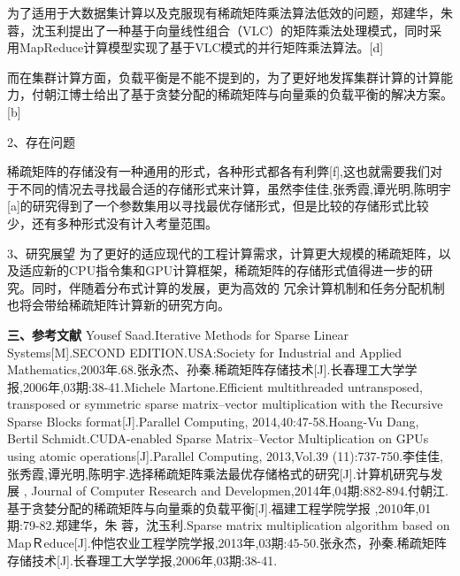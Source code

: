 \documentclass{article}
\begin{document}
为了适用于大数据集计算以及克服现有稀疏矩阵乘法算法低效的问题，郑建华，朱 蓉，沈玉利提出了一种基于向量线性组合（VLC）的矩阵乘法处理模式，同时采用MapReduce计算模型实现了基于VLC模式的并行矩阵乘法算法。[d]

而在集群计算方面，负载平衡是不能不提到的，为了更好地发挥集群计算的计算能力，付朝江博士给出了基于贪婪分配的稀疏矩阵与向量乘的负载平衡的解决方案。[b]


2、存在问题\newline

稀疏矩阵的存储没有一种通用的形式，各种形式都各有利弊[f],这也就需要我们对于不同的情况去寻找最合适的存储形式来计算，虽然李佳佳,张秀霞,谭光明,陈明宇[a]的研究得到了一个参数集用以寻找最优存储形式，但是比较的存储形式比较少，还有多种形式没有计入考量范围。
\newline

3、研究展望\newline
为了更好的适应现代的工程计算需求，计算更大规模的稀疏矩阵，以及适应新的CPU指令集和GPU计算框架，稀疏矩阵的存储形式值得进一步的研究。同时，伴随着分布式计算的发展，更为高效的
冗余计算机制和任务分配机制也将会带给稀疏矩阵计算新的研究方向。

\textbf{三、参考文献}
      \qquad
\newline
 [1]Yousef Saad.Iterative Methods for Sparse Linear Systems[M].SECOND EDITION.USA:Society for Industrial and Applied Mathematics,2003年.68.\newline
 [2]张永杰、孙秦.稀疏矩阵存储技术[J].长春理工大学学报,2006年,03期:38-41.\newline
  [x]Michele Martone.Efficient multithreaded untransposed, transposed or symmetric sparse matrix–vector multiplication with the Recursive Sparse Blocks format[J].Parallel Computing, 2014,40:47-58.\newline
   [y]Hoang-Vu Dang,  Bertil Schmidt.CUDA-enabled Sparse Matrix–Vector Multiplication on GPUs
using atomic operations[J].Parallel Computing, 2013,Vol.39 (11):737-750.\newline
  [a]李佳佳,张秀霞,谭光明,陈明宇.选择稀疏矩阵乘法最优存储格式的研究[J].计算机研究与发展 , Journal of Computer Research and Developmen,2014年,04期:882-894.\newline
[b]付朝江.基于贪婪分配的稀疏矩阵与向量乘的负载平衡[J].福建工程学院学报 ,2010年,01期:79-82.\newline
[d]郑建华，朱 蓉，沈玉利.Sparse matrix multiplication algorithm based on MapＲeduce[J].仲恺农业工程学院学报,2013年,03期:45-50.\newline
[f]张永杰，孙秦.稀疏矩阵存储技术[J].长春理工大学学报,2006年,03期:38-41.\newline
\end{document}
